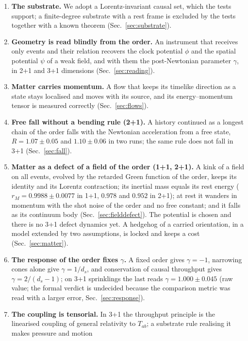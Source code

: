 \begin{enumerate}
\item \textbf{The substrate.} We adopt a Lorentz-invariant causal set, which the tests support; a
  finite-degree substrate with a rest frame is excluded by the tests together with a known theorem (Sec.~\ref{sec:substrate}).
\item \textbf{Geometry is read blindly from the order.} An instrument that receives only events
  and their relation recovers the clock potential $\phi$ and the spatial potential $\psi$ of a weak
  field, and with them the post-Newtonian parameter $\gamma$, in 2+1 and 3+1 dimensions
  (Sec.~\ref{sec:reading}).
\item \textbf{Matter carries momentum.} A flow that keeps its timelike direction as a state stays
  localised and moves with its source, and its energy--momentum tensor is measured correctly
  (Sec.~\ref{sec:flows}).
\item \textbf{Free fall without a bending rule (2+1).} A history continued as a longest chain of the order
  falls with the Newtonian acceleration from a free state, $R=1.07\pm0.05$ and $1.10\pm0.06$ in two runs; the
  same rule does not fall in 3+1 (Sec.~\ref{sec:fall}).
\item \textbf{Matter as a defect of a field of the order (1+1, 2+1).} A kink of a field on all events, evolved
  by the retarded Green function of the order, keeps its identity and its Lorentz contraction; its inertial mass
  equals its rest energy ($r_M=0.9988\pm0.0077$ in 1+1, $0.978$ and $0.952$ in 2+1); at rest it wanders in
  momentum with the shot noise of the order and no free constant; and it falls as its continuum body
  (Sec.~\ref{sec:fielddefect}). The potential is chosen and there is no 3+1 defect dynamics yet. A hedgehog of a
  carried orientation, in a model extended by two assumptions, is locked and keeps a cost (Sec.~\ref{sec:matter}).
\item \textbf{The response of the order fixes $\gamma$.} A fixed order gives $\gamma=-1$, narrowing
  cones alone give $\gamma=1/d_s$, and conservation of causal throughput gives
  $\gamma=2/(d_s-1)$; on 3+1 sprinklings the last reads $\gamma=1.000\pm0.045$ (raw value; the
  formal verdict is undecided because the comparison metric was read with a larger error,
  Sec.~\ref{sec:response}).
\item \textbf{The coupling is tensorial.} In 3+1 the throughput principle is the linearised coupling
  of general relativity to $T_{ab}$; a substrate rule realising it makes pressure and motion

\end{enumerate}

